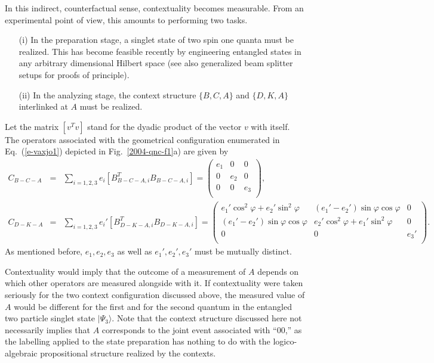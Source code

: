 \documentclass{aipproc}
\begin{document}
In this indirect, counterfactual sense, contextuality becomes measurable.
From an experimental point of view, this amounts to performing two tasks.
\begin{itemize}
\item[(i)]
In the preparation stage,
a singlet state of two spin one quanta must be realized.
This has become feasible recently by
engineering entangled
states in any arbitrary dimensional Hilbert space
\cite{mvwz-2001,vwz-2002,gisin-2002-d,tdtm-2003}
(see also generalized beam splitter setups  \cite{rzbb,reck-94,zukowski-97,svozil-2004-analog} for proofs of principle).
\item[(ii)]
In the analyzing stage,
the context structure  $\{B,C,A\}$ and $\{D,K,A\}$ interlinked at $A$ must be realized.
\end{itemize}
Let the matrix $[{ v}^T{ v}]$
stand for the dyadic product
of the vector ${ v}$ with itself.
The operators
associated with the geometrical configuration enumerated in Eq.~(\ref{e-vaxjo1})
depicted in Fig.~\ref{2004-qnc-f1}a) are given by
\begin{equation}
\begin{array}{lcl}
C_{B-C-A}&=& \sum_{i=1,2,3} e_i [B_{B-C-A,i}^T B_{B-C-A,i}]=
\left(
\begin{array}{ccc}
e_1&0&0\\
0&e_2&0\\
0&0&e_3\\
\end{array}
\right)
,
\\
C_{D-K-A}
&=& \sum_{i=1,2,3} e_i' [B_{D-K-A,i}^T B_{D-K-A,i}]=
\left(
\begin{array}{ccc}
e_1' \cos^2 \varphi + e_2'\sin^2 \varphi&(e_1'-e_2')\sin \varphi \cos \varphi &0\\
(e_1'-e_2')\sin \varphi \cos \varphi &e_2' \cos^2 \varphi + e_1'\sin^2 \varphi &0\\
0&0&e_3'\\
\end{array}
\right).
\end{array}
\label{e-vaxjo2}
\end{equation}
As mentioned before,
$e_1,e_2,e_3$
as well as
$e_1',e_2',e_3'$
must be mutually distinct.


Contextuality would imply that the outcome of a measurement of $A$ depends on which other operators
are measured alongside with it.
If contextuality were taken seriously for the two context configuration
discussed above, the measured value of $A$ would be different for the first and for the second quantum
in the entangled two particle singlet state $\vert \Psi_3 \rangle$.
Note that the context structure discussed here not necessarily implies that
$A$ corresponds to the joint event associated with ``$00$,''
as the labelling applied to the state preparation has nothing to do with the
logico-algebraic propositional structure realized by the contexts.
\end{document}
